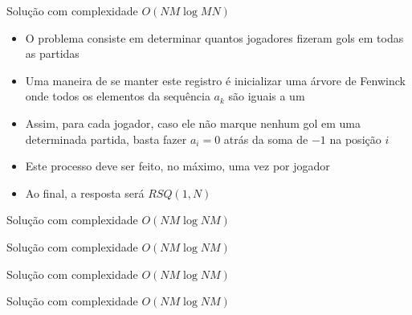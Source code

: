\begin{frame}[fragile]{Solução com complexidade $O(NM\log MN)$}

    \begin{itemize}
        \item O problema consiste em determinar quantos jogadores fizeram gols em todas as
            partidas

        \item Uma maneira de se manter este registro é inicializar uma árvore de Fenwinck 
            onde todos os elementos da sequência $a_k$ são iguais a um

        \item Assim, para cada jogador, caso ele não marque nenhum gol em uma determinada 
            partida, basta fazer $a_i = 0$ atrás da soma de $-1$ na posição $i$

        \item Este processo deve ser feito, no máximo, uma vez por jogador

        \item Ao final, a resposta será $RSQ(1, N)$

   \end{itemize}

\end{frame}

\begin{frame}[fragile]{Solução com complexidade $O(NM\log NM)$}
\end{frame}

\begin{frame}[fragile]{Solução com complexidade $O(NM\log NM)$}
\end{frame}

\begin{frame}[fragile]{Solução com complexidade $O(NM\log NM)$}
\end{frame}

\begin{frame}[fragile]{Solução com complexidade $O(NM\log NM)$}
\end{frame}

